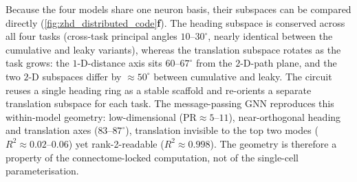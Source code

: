 \documentclass[11pt]{article}
\begin{document}
Because the four models share one neuron basis, their subspaces can be compared
directly (\cref{fig:zhd_distributed_code}\textbf{f}). The heading subspace is
conserved across all four tasks (cross-task principal angles $10$--$30^\circ$,
nearly identical between the cumulative and leaky variants), whereas the
translation subspace rotates as the task grows: the $1$-D-distance axis sits
$60$--$67^\circ$ from the $2$-D-path plane, and the two $2$-D subspaces differ
by ${\approx}50^\circ$ between cumulative and leaky. The circuit reuses a
single heading ring as a stable scaffold and re-orients a separate
translation subspace for each task. The message-passing GNN reproduces this
within-model geometry: low-dimensional ($\mathrm{PR}\approx5$--$11$),
near-orthogonal heading and translation axes ($83$--$87^\circ$), translation
invisible to the top two modes ($R^2\!\approx\!0.02$--$0.06$) yet
rank-2-readable ($R^2\!\approx\!0.998$). The geometry is therefore a property of
the connectome-locked computation, not of the single-cell parameterisation.
\end{document}
